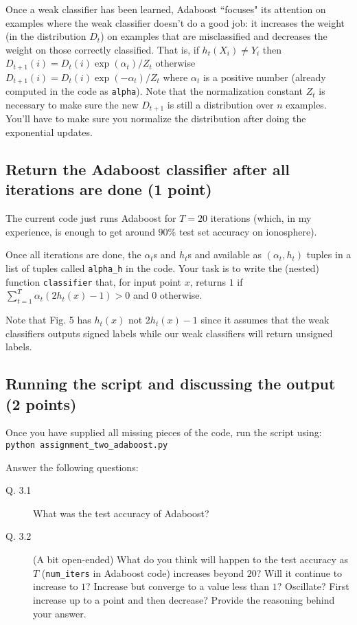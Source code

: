 \documentclass{article}
\begin{document}
Once a weak classifier has been learned, Adaboost ``focuses" its attention on examples where the weak classifier doesn't do a good job:
it increases the weight (in the distribution $D_t$) on examples that are misclassified and decreases the weight on those correctly classified.
That is, if $h_t(X_i) \neq Y_i$ then $D_{t+1}(i) = D_t(i)\exp(\alpha_t)/Z_t$ otherwise $D_{t+1}(i) = D_t(i)\exp(-\alpha_t)/Z_t$ where
$\alpha_t$ is a positive number (already computed in the code as {\tt alpha}). Note that the normalization constant $Z_t$ is necessary
to make sure the new $D_{t+1}$ is still a distribution over $n$ examples. You'll have to make sure you normalize the distribution after
doing the exponential updates.

\subsection{Return the Adaboost classifier after all iterations are done (1 point)}

The current code just runs Adaboost for $T=20$ iterations (which, in my experience, is enough to get around $90\%$ test set accuracy
on ionosphere).

Once all iterations are done, the $\alpha_t$s and $h_t$s and available as $(\alpha_t, h_t)$ tuples in a list of tuples called
{\tt alpha\_h} in the code. Your task is to write the (nested) function {\tt classifier}
that, for input point $x$, returns $1$ if $\sum_{t=1}^T \alpha_t (2h_t(x)-1) > 0$ and $0$ otherwise.

Note that Fig. 5 has $h_t(x)$ not $2h_t(x)-1$ since it assumes that the weak classifiers outputs signed labels
while our weak classifiers will return unsigned labels.

\subsection{Running the script and discussing the output (2 points)}

Once you have supplied all missing pieces of the code, run the script using:\\
{\tt python assignment\_two\_adaboost.py}

Answer the following questions:
\begin{description}
\item[Q. 3.1]
What was the test accuracy of Adaboost?
\item[Q. 3.2]
(A bit open-ended) What do you think will happen to the test accuracy as $T$ ({\tt num\_iters} in Adaboost code) increases beyond $20$?
Will it continue to increase to $1$? Increase but converge to a value less than $1$? Oscillate? First increase up to a point
and then decrease? Provide the reasoning behind your answer.
\end{description}
\end{document}
